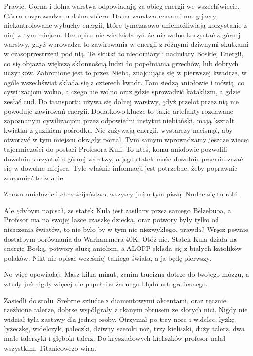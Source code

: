 \ds{} Prawie. Górna i dolna warstwa odpowiadają za obieg energii we wszechświecie. Górna rozprowadza, a dolna zbiera.
Dolna warstwa czasami ma gejzery, niekontrolowane wybuchy energii, które tymczasowo uniemożliwiają korzystanie z niej w tym miejscu.
Bez opisu nie wiedziałabyś, że nie wolno korzystać z górnej warstwy, gdyż wprowadza to zawirowania w energii z różnymi dziwnymi skutkami w czasoprzestrzeni pod nią.
Te skutki to niedomiary i nadmiary Boskiej Energii, co się objawia większą skłonnością ludzi do popełniania grzechów, lub dobrych uczynków.
Zabronione jest to przez Niebo, znajdujące się w pierwszej kwadrze, w ogóle wszechświat składa się z czterech kwadr.
Tam siedzą aniołowie i mówią, co cywilizacjom wolno, a czego nie wolno oraz gdzie sprowadzić kataklizm, a gdzie zesłać cud. Do transportu używa się dolnej warstwy, gdyż przelot przez nią nie powoduje zawirowań energii. 
Dodatkowo klucze to takie artefakty rozdawane zapoznanym cywilizacjom przez odpowiedni instytut niebiański, mają kształt kwiatka z guzikiem pośrodku. Nie zużywają energii, wystarczy nacisnąć, aby otworzyć w tym miejscu okrągły portal. Tym samym wprowadzamy jeszcze więcej tajemniczości do postaci Profesora Kuli.
To ktoś, komu aniołowie pozwolili dowolnie korzystać z górnej warstwy, a jego statek może dowolnie przemieszczać się w dowolne miejsca.
Tyle właśnie informacji jest potrzebne, żeby poprawnie zrozumieć to zdanie. \de{}

\ds{} Znowu aniołowie i chrześcijaństwo, wszyscy już o tym piszą. Nudne się to robi. \de{}

\ds{} Ale gdybym napisał, że statek Kula jest zasilany przez samego Belzebuba, a Profesor ma na swojej lasce czaszkę dziecka, oraz potwory były tylko od niszczenia światów, to nie było by w tym nic niezwykłego, prawda? Wręcz pewnie dostałbym porównania do Warhammera 40K. Otóż nie. Statek Kula działa na energię Boską, potwory służą aniołom, a ALOPP składa się z białych katolików polaków. 
Nikt nie opisał wcześniej takiego świata, a ja będę pierwszy. \de{}

\ds{} No więc opowiadaj. Masz kilka minut, zanim trucizna dotrze do twojego mózgu, a wtedy już nigdy więcej nie popełnisz żadnego błędu ortograficznego. \de{}

\divider{}

Zasiedli do stołu. Srebrne sztućce z diamentowymi akcentami, oraz ręcznie rzeźbione talerze, dobrze współgrały z tkanym obrusem ze złotych nici.
Nigdy nie widział tylu zastawy dla jednej osoby. Otrzymał po trzy noże i widelce, łyżkę, łyżeczkę, widelczyk, pałeczki, dziwny szeroki nóż, trzy kieliszki, duży talerz, dwa małe talerzyki i głęboki talerz.
Do kryształowych kieliszków profesor nalał wszystkim. Titanicowego wina.

